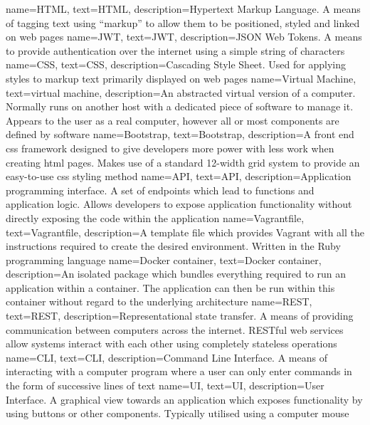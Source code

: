 {
    name={HTML},
    text={HTML},
    description={Hypertext Markup Language. A means of tagging text using ``markup'' to allow them to be positioned, styled and linked on web pages}
}
{
    name={JWT},
    text={JWT},
    description={JSON Web Tokens. A means to provide authentication over the internet using a simple string of characters}
}
{
    name={CSS},
    text={CSS},
    description={Cascading Style Sheet. Used for applying styles to markup text primarily displayed on web pages}
}
{
    name={Virtual Machine},
    text={virtual machine},
    description={An abstracted virtual version of a computer. Normally runs on another host with a dedicated piece of software to manage it. Appears to the user as a real computer, however all or most components are defined by software}
}
{
    name={Bootstrap},
    text={Bootstrap},
    description={A front end css framework designed to give developers more power with less work when creating html pages. Makes use of a standard 12-width grid system to provide an easy-to-use css styling method}
}
{
    name={API},
    text={API},
    description={Application programming interface. A set of endpoints which lead to functions and application logic. Allows developers to expose application functionality without directly exposing the code within the application}
}
{
    name={Vagrantfile},
    text={Vagrantfile},
    description={A template file which provides Vagrant with all the instructions required to create the desired environment. Written in the Ruby programming language}
}
{
    name={Docker container},
    text={Docker container},
    description={An isolated package which bundles everything required to run an application within a container. The application can then be run within this container without regard to the underlying architecture}
}
{
    name={REST},
    text={REST},
    description={Representational state transfer. A means of providing communication between computers across the internet. RESTful web services allow systems interact with each other using completely stateless operations}
}
{
    name={CLI},
    text={CLI},
    description={Command Line Interface. A means of interacting with a computer program where a user can only enter commands in the form of successive lines of text}
}
{
    name={UI},
    text={UI},
    description={User Interface. A graphical view towards an application which exposes functionality by using buttons or other components. Typically utilised using a computer mouse}
}

